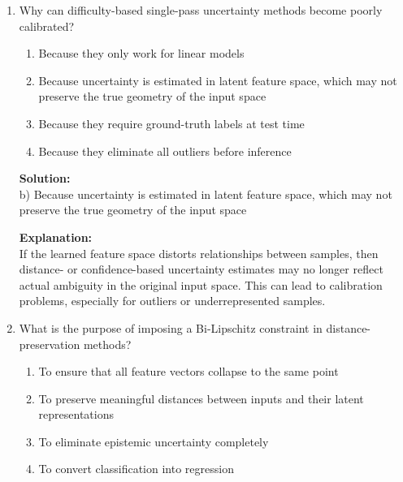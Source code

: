 \documentclass{article}
\begin{document}
\begin{enumerate}
\textbf{Solution:} \\
b) It avoids the computational cost of multiple forward passes or multiple models

\textbf{Explanation:} \\
Single-pass methods estimate uncertainty from one forward pass, making them more efficient in time-sensitive or resource-constrained environments. Their main tradeoff is that they often rely on additional assumptions and may produce less reliable uncertainty estimates than iterative methods.

\vspace{2mm}

\item Why can difficulty-based single-pass uncertainty methods become poorly calibrated?

\begin{enumerate}
    \item Because they only work for linear models
    \item Because uncertainty is estimated in latent feature space, which may not preserve the true geometry of the input space
    \item Because they require ground-truth labels at test time
    \item Because they eliminate all outliers before inference
\end{enumerate}

\textbf{Solution:} \\
b) Because uncertainty is estimated in latent feature space, which may not preserve the true geometry of the input space

\textbf{Explanation:} \\
If the learned feature space distorts relationships between samples, then distance- or confidence-based uncertainty estimates may no longer reflect actual ambiguity in the original input space. This can lead to calibration problems, especially for outliers or underrepresented samples.

\vspace{2mm}

\item What is the purpose of imposing a Bi-Lipschitz constraint in distance-preservation methods?

\begin{enumerate}
    \item To ensure that all feature vectors collapse to the same point
    \item To preserve meaningful distances between inputs and their latent representations
    \item To eliminate epistemic uncertainty completely
    \item To convert classification into regression
\end{enumerate}


\end{enumerate}
\end{document}
